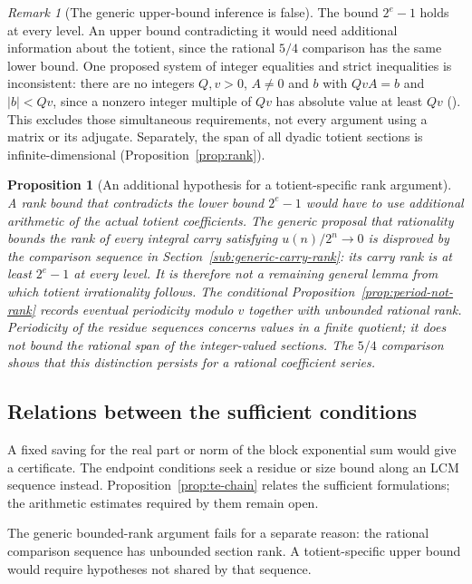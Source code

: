 \documentclass[11pt]{article}
\theoremstyle{plain}
\newtheorem{prop}[thm]{Proposition}
\theoremstyle{definition}
\theoremstyle{remark}
\newtheorem{rem}[thm]{Remark}
\newcommand{\lean}[2]{\leanlink{#2}}
\begin{document}
\begin{rem}[The generic upper-bound inference is false]
The bound $2^e-1$ holds at every level. An upper bound contradicting it
would need additional information about the totient, since the rational
$5/4$ comparison has the same lower bound. One proposed system of integer
equalities and strict inequalities is inconsistent: there are no integers
$Q,v>0$, $A\ne0$ and $b$ with $QvA=b$ and $|b|<Qv$, since a nonzero
integer multiple of $Qv$ has absolute value at least $Qv$
(\lean{false_of_compressedAdjointCertificate}{TotientMahlerDefect.lean:1183}).
This excludes those simultaneous
requirements, not every argument using a matrix or its adjugate.
Separately, the span of all dyadic totient sections is
infinite-dimensional (Proposition~\ref{prop:rank}).
\end{rem}

\begin{prop}[An additional hypothesis for a totient-specific rank argument]\label{prop:additional-hypothesis-totient-specific-rank}
A rank bound that contradicts the lower bound $2^e-1$ would have to use
additional arithmetic of the actual totient coefficients. The generic
proposal that rationality bounds the rank of every integral carry
satisfying $u(n)/2^n\to0$ is disproved by the comparison sequence
in Section~\ref{sub:generic-carry-rank}:
its carry rank is at least $2^e-1$ at every level. It is therefore not a
remaining general lemma from which totient irrationality follows.
The conditional Proposition~\ref{prop:period-not-rank}
records eventual periodicity modulo $v$ together with unbounded rational
rank. Periodicity of the residue sequences concerns values in a finite
quotient; it does not bound the rational span of the integer-valued
sections. The $5/4$ comparison shows that this distinction persists for
a rational coefficient series.
\end{prop}

\subsection{Relations between the sufficient conditions}

A fixed saving for the real part or norm of the block exponential
sum would give a certificate. The endpoint conditions seek a residue
or size bound along an LCM sequence instead.
Proposition~\ref{prop:te-chain} relates the sufficient formulations;
the arithmetic estimates required by them remain open.

The generic bounded-rank argument fails for a separate reason: the rational
comparison sequence has unbounded section rank. A totient-specific upper
bound would require hypotheses not shared by that sequence.
\end{document}
